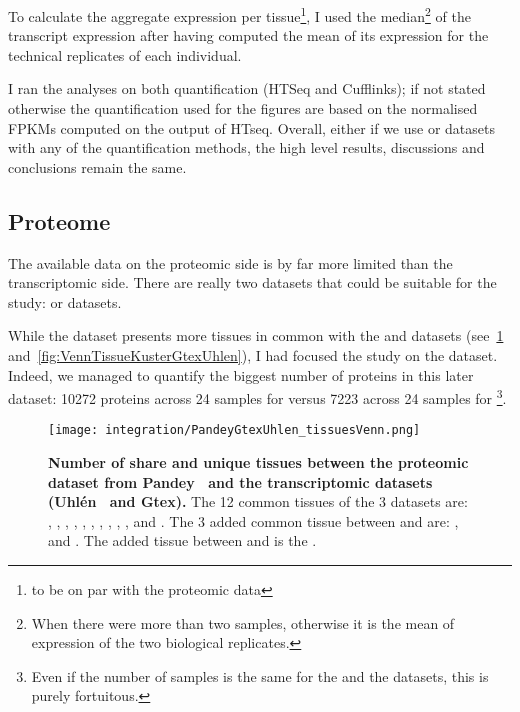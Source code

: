 To calculate the aggregate expression per tissue\footnote{to be on par with the
proteomic data}, I used the median\footnote{When there were more than
two samples, otherwise it is the mean of expression of the two biological
replicates.} of the transcript expression after having computed the mean of its
expression for the technical replicates of each individual.

I ran the analyses on both quantification (HTSeq and Cufflinks); if not stated
otherwise the quantification used for the figures are based on the normalised
\glspl{FPKM} computed on the output of HTseq.
Overall, either if we use  or
 datasets with any of the quantification methods, the high level
results, discussions and conclusions remain the same.

\subsection{Proteome}

The available data on the proteomic side is by far more limited than the
transcriptomic side. There are really two datasets that could be suitable for
the study:  or  datasets.

While the  dataset presents more tissues in common
with the  and  datasets
(see~\cref{fig:VennTissuePandeyGtexUhlen}
and~\cref{fig:VennTissueKusterGtexUhlen}), I had focused the study on
the  dataset. Indeed, we managed to quantify the biggest
number of proteins in this later dataset: 10272 proteins across 24 samples for
 versus 7223 across 24 samples for \footnote{Even
if the number of samples is the same for the  and
the  datasets, this is purely fortuitous.}.

\begin{figure}%
    \texttt{[image: integration/PandeyGtexUhlen\_tissuesVenn.png]}
    \centering
    \caption[Number of share and unique tissues between the proteomic
    dataset from Pandey \etal\ and the transcriptomic datasets (Uhlén \etal\ and
    Gtex)]{\label{fig:VennTissuePandeyGtexUhlen}\textbf{Number of share and unique
    tissues between the proteomic dataset from Pandey \etal\ and the
    transcriptomic datasets (Uhlén \etal\ and Gtex).} The 12 common tissues of
    the 3 datasets are:
    , , , ,
    , , , , ,
    ,  and . The 3 added common
    tissue between  and  are:
    ,  and . The added tissue
    between  and  is the .}
\end{figure}

